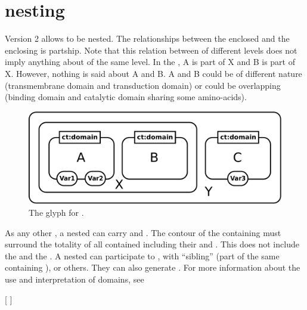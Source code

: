 
\section{ nesting }
\label{sec:domain}

\SBGNERLone Version 2 allows  to be nested. The relationships between the enclosed  and the enclosing  is partship. Note that this relation between  of different levels does not imply anything about  of the same level. In the , A is part of X and B is part of X. However, nothing is said about A and B. A and B could be of different nature (transmembrane domain and transduction domain) or could be overlapping (binding domain and catalytic domain sharing some amino-acids). 

\begin{figure}[H]
  \centering
  \includegraphics[scale = 0.3]{images/domain}
  \caption{The \ER glyph for .}
  \label{fig:domain}
\end{figure}

As any other , a nested  can carry  and . The contour of the containing  must surround the totality of all contained  including their  and . This does not include the  and the . A nested  can participate to , with ``sibling''  (part of the same containing ), or others. They can also generate . For more information about the use and interpretation of domains, see  

[ ]

